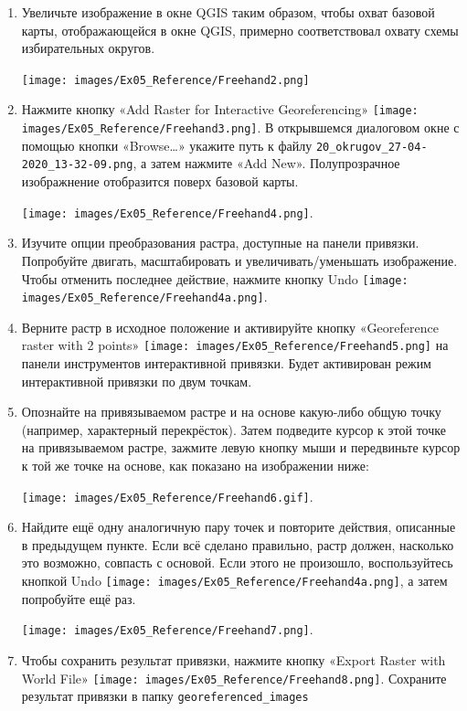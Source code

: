 \documentclass[
  12pt,
]{book}
\begin{document}
\begin{enumerate}
\def\labelenumi{\arabic{enumi}.}
\setcounter{enumi}{4}
\item
  Увеличьте изображение в окне QGIS таким образом, чтобы охват базовой карты, отображающейся в окне QGIS, примерно соответствовал охвату схемы избирательных округов.

  \texttt{[image: images/Ex05\_Reference/Freehand2.png]}
\item
  Нажмите кнопку «Add Raster for Interactive Georeferencing» \texttt{[image: images/Ex05\_Reference/Freehand3.png]}. В открывшемся диалоговом окне с помощью кнопки «Browse\ldots» укажите путь к файлу \texttt{20\_okrugov\_27-04-2020\_13-32-09.png}, а затем нажмите «Add New». Полупрозрачное изображнение отобразится поверх базовой карты.

  \texttt{[image: images/Ex05\_Reference/Freehand4.png]}.
\item
  Изучите опции преобразования растра, доступные на панели привязки. Попробуйте двигать, масштабировать и увеличивать/уменьшать изображение. Чтобы отменить последнее действие, нажмите кнопку Undo \texttt{[image: images/Ex05\_Reference/Freehand4a.png]}.
\item
  Верните растр в исходное положение и активируйте кнопку «Georeference raster with 2 points» \texttt{[image: images/Ex05\_Reference/Freehand5.png]} на панели инструментов интерактивной привязки. Будет активирован режим интерактивной привязки по двум точкам.
\item
  Опознайте на привязываемом растре и на основе какую-либо общую точку (например, характерный перекрёсток). Затем подведите курсор к этой точке на привязываемом растре, зажмите левую кнопку мыши и передвиньте курсор к той же точке на основе, как показано на изображении ниже:

  \texttt{[image: images/Ex05\_Reference/Freehand6.gif]}.
\item
  Найдите ещё одну аналогичную пару точек и повторите действия, описанные в предыдущем пункте. Если всё сделано правильно, растр должен, насколько это возможно, совпасть с основой. Если этого не произошло, воспользуйтесь кнопкой Undo \texttt{[image: images/Ex05\_Reference/Freehand4a.png]}, а затем попробуйте ещё раз.

  \texttt{[image: images/Ex05\_Reference/Freehand7.png]}.
\item
  Чтобы сохранить результат привязки, нажмите кнопку «Export Raster with World File» \texttt{[image: images/Ex05\_Reference/Freehand8.png]}. Сохраните результат привязки в папку \texttt{georeferenced\_images}
\end{enumerate}
\end{document}
